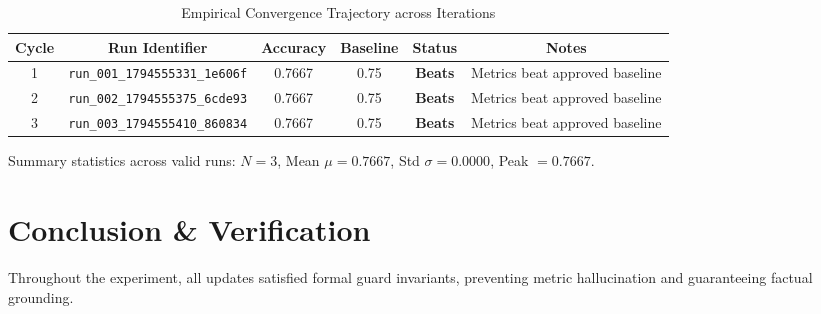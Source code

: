 \documentclass[11pt,a4paper]{article}
\begin{document}
\begin{table}[ht]
\centering
\begin{tabular}{cccccc}
\toprule
\textbf{Cycle} & \textbf{Run Identifier} & \textbf{Accuracy} & \textbf{Baseline} & \textbf{Status} & \textbf{Notes} \\
\midrule
    1 & \texttt{run\_001\_1794555331\_1e606f} & 0.7667 & 0.75 & \textbf{Beats} & Metrics beat approved baseline \\
    2 & \texttt{run\_002\_1794555375\_6cde93} & 0.7667 & 0.75 & \textbf{Beats} & Metrics beat approved baseline \\
    3 & \texttt{run\_003\_1794555410\_860834} & 0.7667 & 0.75 & \textbf{Beats} & Metrics beat approved baseline \\
\bottomrule
\end{tabular}
\caption{Empirical Convergence Trajectory across Iterations}
\label{tab:results}
\end{table}

Summary statistics across valid runs: $N = 3$, Mean $\mu = 0.7667$, Std $\sigma = 0.0000$, Peak $= 0.7667$.

\section{Conclusion & Verification}
Throughout the experiment, all updates satisfied formal guard invariants, preventing metric hallucination and guaranteeing factual grounding.
\end{document}
